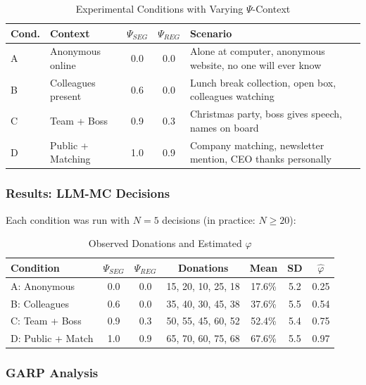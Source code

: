 \begin{table}[htbp]
\centering
\caption{Experimental Conditions with Varying $\Psi$-Context}
\label{tab:phi-conditions}
\renewcommand{\arraystretch}{1.3}
\begin{tabular}{@{}llccp{5cm}@{}}
\toprule
\textbf{Cond.} & \textbf{Context} & $\Psi_{SEG}$ & $\Psi_{REG}$ & \textbf{Scenario} \\
\midrule
A & Anonymous online & 0.0 & 0.0 & Alone at computer, anonymous website, no one will ever know \\
B & Colleagues present & 0.6 & 0.0 & Lunch break collection, open box, colleagues watching \\
C & Team + Boss & 0.9 & 0.3 & Christmas party, boss gives speech, names on board \\
D & Public + Matching & 1.0 & 0.9 & Company matching, newsletter mention, CEO thanks personally \\
\bottomrule
\end{tabular}
\end{table}

\subsubsection{Results: LLM-MC Decisions}

Each condition was run with $N=5$ decisions (in practice: $N \geq 20$):

\begin{table}[htbp]
\centering
\caption{Observed Donations and Estimated $\varphi$}
\label{tab:phi-results}
\renewcommand{\arraystretch}{1.3}
\begin{tabular}{@{}lcccccc@{}}
\toprule
\textbf{Condition} & $\Psi_{SEG}$ & $\Psi_{REG}$ & \textbf{Donations} & \textbf{Mean} & \textbf{SD} & $\hat{\varphi}$ \\
\midrule
A: Anonymous & 0.0 & 0.0 & 15, 20, 10, 25, 18 & 17.6\% & 5.2 & 0.25 \\
B: Colleagues & 0.6 & 0.0 & 35, 40, 30, 45, 38 & 37.6\% & 5.5 & 0.54 \\
C: Team + Boss & 0.9 & 0.3 & 50, 55, 45, 60, 52 & 52.4\% & 5.4 & 0.75 \\
D: Public + Match & 1.0 & 0.9 & 65, 70, 60, 75, 68 & 67.6\% & 5.5 & 0.97 \\
\bottomrule
\end{tabular}
\end{table}

\subsubsection{GARP Analysis}

